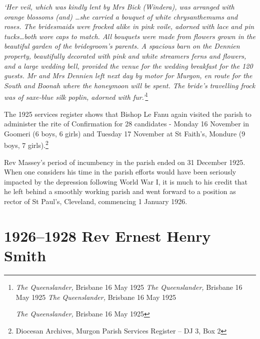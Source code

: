 \emph{`Her veil, which was kindly lent by Mrs Bick (Windera), was arranged with orange blossoms (and) \ldots she carried a bouquet of white chrysanthemums and roses. The bridesmaids were frocked alike in pink voile, adorned with lace and pin tucks\ldots both wore caps to match. All bouquets were made from flowers grown in the beautiful garden of the bridegroom's parents. A spacious barn on the Dennien property, beautifully decorated with pink and white streamers ferns and flowers, and a large wedding bell, provided the venue for the wedding breakfast for the 120 guests. Mr and Mrs Dennien left next day by motor for Murgon, en route for the South and Boonah where the honeymoon will be spent. The bride's travelling frock was of saxe-blue silk poplin, adorned with fur.'}\footnote{\emph{The Queenslander,} Brisbane 16 May 1925 \emph{The Queenslander,} Brisbane 16 May 1925 \emph{The Queenslander,} Brisbane 16 May 1925


  \emph{The Queenslander,} Brisbane 16 May 1925}



\smallskip


The 1925 services register shows that Bishop Le Fanu again visited the parish to administer the rite of Confirmation for 28 candidates - Monday 16 November in Goomeri (6 boys, 6 girls) and Tuesday 17 November at St Faith's, Mondure (9 boys, 7 girls).\footnote{Diocesan Archives, Murgon Parish Services Register -- DJ 3, Box 2}


Rev Massey's period of incumbency in the parish ended on 31 December 1925. When one considers his time in the parish efforts would have been seriously impacted by the depression following World War I, it is much to his credit that he left behind a smoothly working parish and went forward to a position as rector of St Paul's, Cleveland, commencing 1 January 1926.



\balance


\printendnotes[custom]
\setcounter{endnote}{0}
\chapter{1926--1928 Rev Ernest Henry Smith}
\nobalance








